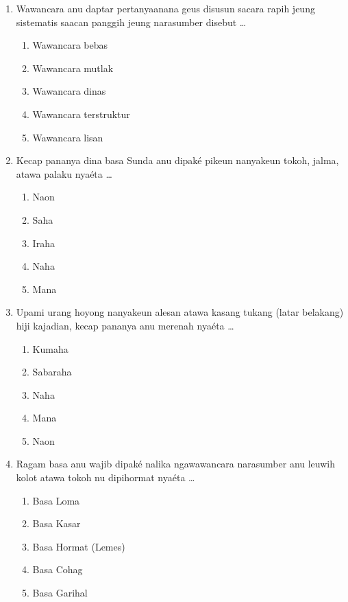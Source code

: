 \documentclass[12pt,a4paper]{article}
\begin{document}
\begin{enumerate}[leftmargin=*]
\item Wawancara anu daptar pertanyaanana geus disusun sacara rapih jeung sistematis saacan panggih jeung narasumber disebut \dots
    \begin{enumerate}[label=\alph*.]
        \item Wawancara bebas
        \item Wawancara mutlak
        \item Wawancara dinas
        \item Wawancara terstruktur
        \item Wawancara lisan
    \end{enumerate}

\item Kecap pananya dina basa Sunda anu dipaké pikeun nanyakeun tokoh, jalma, atawa palaku nyaéta \dots
    \begin{enumerate}[label=\alph*.]
        \item Naon
        \item Saha
        \item Iraha
        \item Naha
        \item Mana
    \end{enumerate}

\item Upami urang hoyong nanyakeun alesan atawa kasang tukang (latar belakang) hiji kajadian, kecap pananya anu merenah nyaéta \dots
    \begin{enumerate}[label=\alph*.]
        \item Kumaha
        \item Sabaraha
        \item Naha
        \item Mana
        \item Naon
    \end{enumerate}

\item Ragam basa anu wajib dipaké nalika ngawawancara narasumber anu leuwih kolot atawa tokoh nu dipihormat nyaéta \dots
    \begin{enumerate}[label=\alph*.]
        \item Basa Loma
        \item Basa Kasar
        \item Basa Hormat (Lemes)
        \item Basa Cohag
        \item Basa Garihal
    \end{enumerate}


\end{enumerate}
\end{document}

